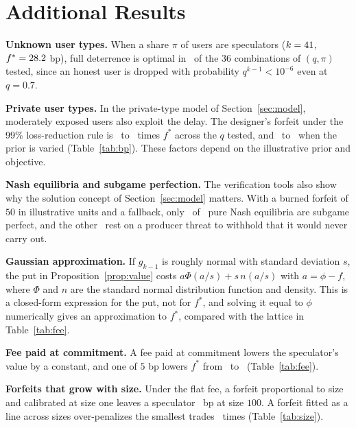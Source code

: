 \documentclass[11pt]{article}
\begin{document}
\clearpage
\section{Additional Results}\label{app:extra}
\textbf{Unknown user types.} When a share $\pi$ of users are speculators ($k=41$, $f^*=28.2$ bp), full deterrence is optimal in \DesFull\ of the 36 combinations of $(q,\pi)$ tested, since an honest user is dropped with probability $q^{k-1}<10^{-6}$ even at $q=0.7$.

\textbf{Private user types.} In the private-type model of Section~\ref{sec:model}, moderately exposed users also exploit the delay. The designer's forfeit under the 99\% loss-reduction rule is \BPLow\ to \BPHigh\ times $f^*$ across the $q$ tested, and \BPSensLo\ to \BPSensHi\ when the prior is varied (Table~\ref{tab:bp}). These factors depend on the illustrative prior and objective.

\textbf{Nash equilibria and subgame perfection.} The verification tools also show why the solution concept of Section~\ref{sec:model} matters. With a burned forfeit of $50$ in illustrative units and a fallback, only \BurnSPNE\ of \BurnNash\ pure Nash equilibria are subgame perfect, and the other \BurnNonCred\ rest on a producer threat to withhold that it would never carry out.

\textbf{Gaussian approximation.} If $g_{k-1}$ is roughly normal with standard deviation $s$, the put in Proposition~\ref{prop:value} costs $a\Phi(a/s)+s\,n(a/s)$ with $a=\phi-f$, where $\Phi$ and $n$ are the standard normal distribution function and density. This is a closed-form expression for the put, not for $f^*$, and solving it equal to $\phi$ numerically gives an approximation to $f^*$, compared with the lattice in Table~\ref{tab:fee}.

\textbf{Fee paid at commitment.} A fee paid at commitment lowers the speculator's value by a constant, and one of $5$ bp lowers $f^*$ from \FstarKHundred\ to \CommitFeeFive\ (Table~\ref{tab:fee}).

\textbf{Forfeits that grow with size.} Under the flat fee, a forfeit proportional to size and calibrated at size one leaves a speculator \SizePropMaxResidual\ bp at size $100$. A forfeit fitted as a line across sizes over-penalizes the smallest trades \SizeLineOverSmall\ times (Table~\ref{tab:size}).
\end{document}
